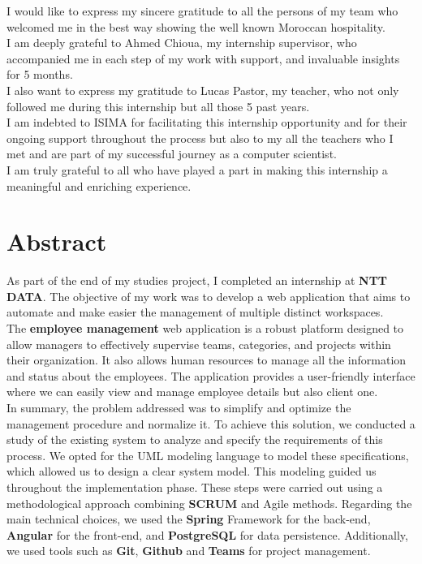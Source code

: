 \documentclass[12pt,a4paper,table,english]{article}
\begin{document}
	I would like to express my sincere gratitude to all the persons of my team who welcomed me in the best way showing the well known Moroccan hospitality.\\
	
	I am deeply grateful to Ahmed Chioua, my internship supervisor, who accompanied me in each step of my work with support, and invaluable insights for 5 months.\\
	
	I also want to express my gratitude to Lucas Pastor, my teacher, who not only followed me during this internship but all those 5 past years.\\
		
	I am indebted to ISIMA for facilitating this internship opportunity and for their ongoing support throughout the process but also to my all the teachers who I met and are part of my successful journey as a computer scientist.\\
			
	I am truly grateful to all who have played a part in making this internship a meaningful and enriching experience.\\
	
	\pagebreak
	
	\listoffigures
	\pagebreak
	
	\listoftables
	\pagebreak

	\section{Abstract}
	
	As part of the end of my studies project, I completed an internship at \textbf{NTT DATA}. The objective of my work was to develop a web application that aims to automate and make easier the management of multiple distinct workspaces.\\
	
	The \textbf{employee management} web application is a robust platform designed to allow managers to effectively supervise teams, categories, and projects within their organization. It also allows human resources to manage all the information and status about the employees. The application provides a user-friendly interface where we can easily view and manage employee details but also client one.\\
	
	In summary, the problem addressed was to simplify and optimize the management
	procedure and normalize it.	To achieve this solution, we conducted a study of the existing system to analyze and specify the requirements of this process. We opted for the UML modeling language to model these specifications, which allowed us to design a clear system model. This modeling guided us throughout the implementation phase. These steps
	were carried out using a methodological approach combining \textbf{SCRUM} and Agile methods. Regarding the main technical choices, we used the \textbf{Spring} Framework for the back-end, \textbf{Angular} for the front-end, and \textbf{PostgreSQL} for data persistence.
	Additionally, we used tools such as \textbf{Git}, \textbf{Github} and \textbf{Teams} for project management.\\
	
\end{document}
